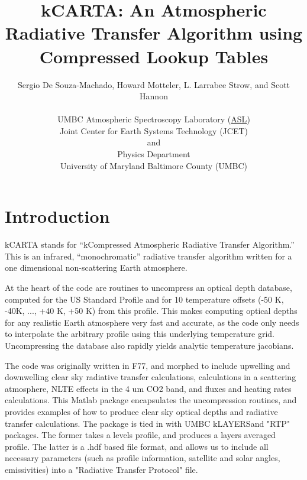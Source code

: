 \documentclass[11pt]{article}
\title{\textbf{\textsf{kCARTA}}: An Atmospheric Radiative Transfer
  Algorithm using Compressed Lookup Tables }
\author{Sergio De Souza-Machado, Howard Motteler, L. Larrabee Strow, and Scott
Hannon\\ 
\vspace{0.1in} \\ 
UMBC Atmospheric Spectroscopy Laboratory (\href{http://asl.umbc.edu}{ASL})\\
Joint Center for Earth Systems Technology (JCET)\\ 
and\\
Physics Department\\ 
University of Maryland Baltimore County (UMBC)
}
\newcommand{\kc}{kCARTA }
\newcommand{\kl}{kLAYERS}
\begin{document}
\maketitle

\section{Introduction}

\kc stands for ``kCompressed Atmospheric Radiative Transfer
Algorithm.''  This is an infrared, ``monochromatic'' radiative
transfer algorithm written for a one dimensional non-scattering Earth
atmosphere. 

At the heart of the code are routines to uncompress an optical depth
database, computed for the US Standard Profile and for 10 temperature
offsets (-50 K, -40K, ..., +40 K, +50 K) from this profile. This makes
computing optical depths for any realistic Earth atmosphere very fast
and accurate, as the code only needs to interpolate the arbitrary
profile using this underlying temperature grid. Uncompressing the
database also rapidly yields analytic temperature jacobians.

The code was originally written in F77, and morphed to include upwelling and
downwelling clear sky radiative transfer calculations, calculations in a 
scattering atmosphere, NLTE effects in the 4 um CO2 band, and fluxes and
heating rates calculations. This Matlab package encapsulates the uncompression
routines, and provides examples of how to produce clear sky optical depths 
and radiative transfer calculations. The package is tied in with UMBC 
\kl and "RTP" packages. The former takes a levels profile, and produces 
a layers averaged profile. The latter is a .hdf based file format, and allows 
us to include all necessary parameters (such as profile information, satellite
and solar angles, emissivities) into a "Radiative Transfer Protocol" file.
\end{document}
